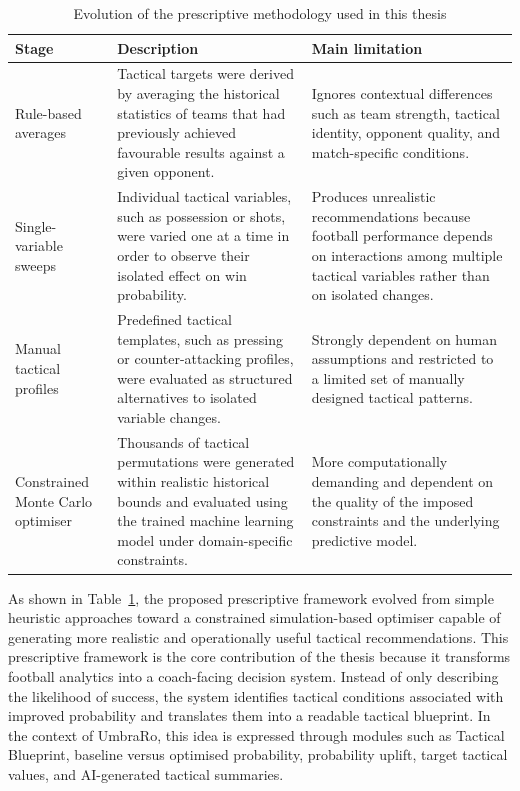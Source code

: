 \begin{table}[htbp]
\centering
\caption{Evolution of the prescriptive methodology used in this thesis}
\label{tab:prescriptive_evolution}
\begin{tabular}{|p{3.2cm}|p{5.5cm}|p{5.5cm}|}
\hline
\textbf{Stage} & \textbf{Description} & \textbf{Main limitation} \\
\hline
Rule-based averages & Tactical targets were derived by averaging the historical statistics of teams that had previously achieved favourable results against a given opponent. & Ignores contextual differences such as team strength, tactical identity, opponent quality, and match-specific conditions. \\
\hline
Single-variable sweeps & Individual tactical variables, such as possession or shots, were varied one at a time in order to observe their isolated effect on win probability. & Produces unrealistic recommendations because football performance depends on interactions among multiple tactical variables rather than on isolated changes. \\
\hline
Manual tactical profiles & Predefined tactical templates, such as pressing or counter-attacking profiles, were evaluated as structured alternatives to isolated variable changes. & Strongly dependent on human assumptions and restricted to a limited set of manually designed tactical patterns. \\
\hline
Constrained Monte Carlo optimiser & Thousands of tactical permutations were generated within realistic historical bounds and evaluated using the trained machine learning model under domain-specific constraints. & More computationally demanding and dependent on the quality of the imposed constraints and the underlying predictive model. \\
\hline
\end{tabular}
\end{table}

As shown in Table~\ref{tab:prescriptive_evolution}, the proposed prescriptive framework evolved from simple heuristic approaches toward a constrained simulation-based optimiser capable of generating more realistic and operationally useful tactical recommendations. This prescriptive framework is the core contribution of the thesis because it transforms football analytics into a coach-facing decision system. Instead of only describing the likelihood of success, the system identifies tactical conditions associated with improved probability and translates them into a readable tactical blueprint. In the context of UmbraRo, this idea is expressed through modules such as Tactical Blueprint, baseline versus optimised probability, probability uplift, target tactical values, and AI-generated tactical summaries.

